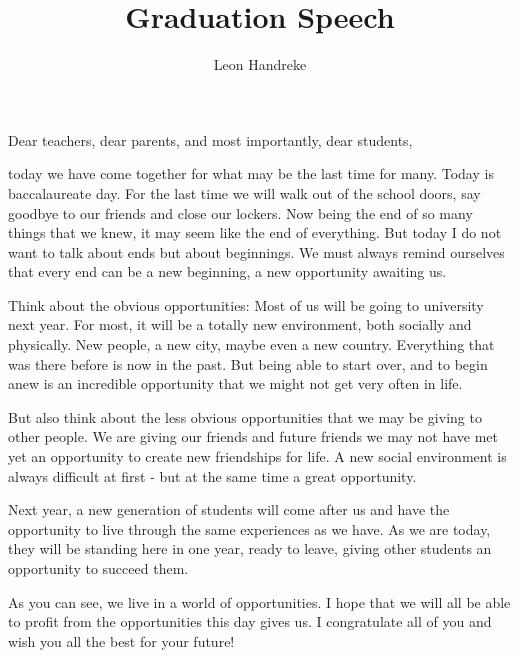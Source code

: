 \documentclass[11pt]{article}
\title{Graduation Speech}
\author{Leon Handreke}
\date{}                                           %
\begin{document}
\onehalfspacing

\maketitle
{}\selectfont

Dear teachers, dear parents, and most importantly, dear students,

today we have come together for what may be the last time for many. Today is baccalaureate day. For the last time we will walk out of the school doors, say goodbye to our friends and close our lockers. Now being the end of so many things that we knew, it may seem like the end of everything. But today I do not want to talk about ends but about beginnings. We must always remind ourselves that every end can be a new beginning, a new opportunity awaiting us.

Think about the obvious opportunities: Most of us will be going to university next year. For most, it will be a totally new environment, both socially and physically. New people, a new city, maybe even a new country. Everything that was there before is now in the past. But being able to start over, and to begin anew is an incredible opportunity that we might not get very often in life.

But also think about the less obvious opportunities that we may be giving to other people. We are giving our friends and future friends we may not have met yet an opportunity to create new friendships for life. A new social environment is always difficult at first - but at the same time a great opportunity.

Next year, a new generation of students will come after us and have the opportunity to live through the same experiences as we have. As we are today, they will be standing here in one year, ready to leave, giving other students an opportunity to succeed them.

As you can see, we live in a world of opportunities. I hope that we will all be able to profit from the opportunities this day gives us. I congratulate all of you and wish you all the best for your future!
\end{document}
